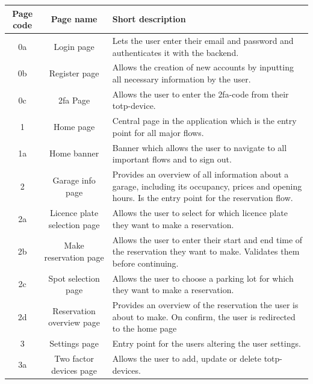 \begin{appendices}
\clearpage

\begin{table}[hpt]
    \centering
    \begin{tabular}{|c|c|p{9cm}|}
    \hline
         \textbf{Page code}& \textbf{Page name} & \textbf{Short description} \\
         \hline
         \hline
         0a & Login page & Lets the user enter their email and password and authenticates it with the backend.\\
         \hline 
         0b & Register page & Allows the creation of new accounts by inputting all necessary information by the user.\\
         \hline 
         0c & \ac{2fa} Page & Allows the user to enter the \ac{2fa}-code from their \ac{totp}-device. \\
         \hline 
         \hline
         1 & Home page & Central page in the application which is the entry point for all major flows.\\
         \hline 
         1a & Home banner & Banner which allows the user to navigate to all important flows and to sign out. \\
         \hline 
         \hline
         2 & Garage info page & Provides an overview of all information about a garage, including its occupancy, prices and opening hours. Is the entry point for the reservation flow.\\
         \hline 
         2a & Licence plate selection page & Allows the user to select for which licence plate they want to make a reservation. \\
         \hline 
         2b & Make reservation page & Allows the user to enter their start and end time of the reservation they want to make. Validates them before continuing. \\
         \hline 
         2c & Spot selection page & Allows the user to choose a parking lot for which they want to make a reservation. \\
         \hline 
         2d & Reservation overview page &  Provides an overview of the reservation the user is about to make. On confirm, the user is redirected to the home page \\
         \hline 
         \hline
         3 & Settings page & Entry point for the users altering the user settings. \\
         \hline 
         3a & Two factor devices page & Allows the user to add, update or delete \ac{totp}-devices. \\
         \hline 

\end{tabular}
\end{table}
\end{appendices}
